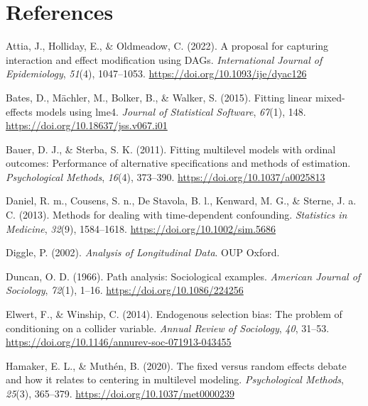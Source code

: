 \documentclass[
  11pt,
  a4paper,
]{article}
\newlength{\cslhangindent}
\newenvironment{CSLReferences}[2] %
 {\begin{list}{}{%
  \setlength{\itemindent}{0pt}
  \setlength{\leftmargin}{0pt}
  \setlength{\parsep}{0pt}
  \ifodd #1
   \setlength{\leftmargin}{\cslhangindent}
   \setlength{\itemindent}{-1\cslhangindent}
  \fi
  \setlength{\itemsep}{#2\baselineskip}}}
 {\end{list}}
\begin{document}
\section{References}\label{references}

\label{refs}
\begin{CSLReferences}{1}{0}
Attia, J., Holliday, E., \& Oldmeadow, C. (2022). A proposal for
capturing interaction and effect modification using DAGs.
\emph{International Journal of Epidemiology}, \emph{51}(4), 1047--1053.
\url{https://doi.org/10.1093/ije/dyac126}

Bates, D., Mächler, M., Bolker, B., \& Walker, S. (2015). Fitting linear
mixed-effects models using {lme4}. \emph{Journal of Statistical
Software}, \emph{67}(1), 148.
\url{https://doi.org/10.18637/jss.v067.i01}

Bauer, D. J., \& Sterba, S. K. (2011). Fitting multilevel models with
ordinal outcomes: Performance of alternative specifications and methods
of estimation. \emph{Psychological Methods}, \emph{16}(4), 373--390.
\url{https://doi.org/10.1037/a0025813}

Daniel, R. m., Cousens, S. n., De Stavola, B. l., Kenward, M. G., \&
Sterne, J. a. C. (2013). Methods for dealing with time-dependent
confounding. \emph{Statistics in Medicine}, \emph{32}(9), 1584--1618.
\url{https://doi.org/10.1002/sim.5686}

Diggle, P. (2002). \emph{Analysis of Longitudinal Data}. OUP Oxford.

Duncan, O. D. (1966). Path analysis: Sociological examples.
\emph{American Journal of Sociology}, \emph{72}(1), 1--16.
\url{https://doi.org/10.1086/224256}

Elwert, F., \& Winship, C. (2014). Endogenous selection bias: The
problem of conditioning on a collider variable. \emph{Annual Review of
Sociology}, \emph{40}, 31--53.
\url{https://doi.org/10.1146/annurev-soc-071913-043455}

Hamaker, E. L., \& Muthén, B. (2020). The fixed versus random effects
debate and how it relates to centering in multilevel modeling.
\emph{Psychological Methods}, \emph{25}(3), 365--379.
\url{https://doi.org/10.1037/met0000239}


\end{CSLReferences}
\end{document}
